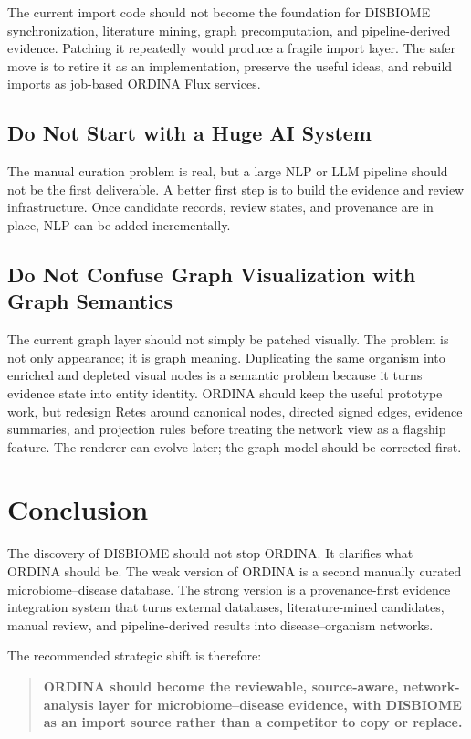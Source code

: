 \documentclass[11pt,a4paper]{article}
\begin{document}
The current import code should not become the foundation for DISBIOME synchronization, literature mining, graph precomputation, and pipeline-derived evidence. Patching it repeatedly would produce a fragile import layer. The safer move is to retire it as an implementation, preserve the useful ideas, and rebuild imports as job-based ORDINA Flux services.

\subsection{Do Not Start with a Huge AI System}

The manual curation problem is real, but a large NLP or LLM pipeline should not be the first deliverable. A better first step is to build the evidence and review infrastructure. Once candidate records, review states, and provenance are in place, NLP can be added incrementally.

\subsection{Do Not Confuse Graph Visualization with Graph Semantics}

The current graph layer should not simply be patched visually. The problem is not only appearance; it is graph meaning. Duplicating the same organism into enriched and depleted visual nodes is a semantic problem because it turns evidence state into entity identity. ORDINA should keep the useful prototype work, but redesign Retes around canonical nodes, directed signed edges, evidence summaries, and projection rules before treating the network view as a flagship feature. The renderer can evolve later; the graph model should be corrected first.

\section{Conclusion}

The discovery of DISBIOME should not stop ORDINA. It clarifies what ORDINA should be. The weak version of ORDINA is a second manually curated microbiome--disease database. The strong version is a provenance-first evidence integration system that turns external databases, literature-mined candidates, manual review, and pipeline-derived results into disease--organism networks.

The recommended strategic shift is therefore:

\begin{quote}
\textbf{ORDINA should become the reviewable, source-aware, network-analysis layer for microbiome--disease evidence, with DISBIOME as an import source rather than a competitor to copy or replace.}
\end{quote}
\end{document}
